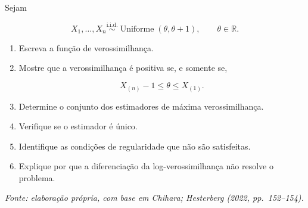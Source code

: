 \documentclass[
  letterpaper,
  DIV=11,
  numbers=noendperiod]{scrreprt}
\begin{document}
\begin{tcolorbox}[enhanced jigsaw, colback=white, leftrule=.75mm, colbacktitle=quarto-callout-tip-color!10!white, breakable, titlerule=0mm, bottomtitle=1mm, title=\textcolor{quarto-callout-tip-color}{\faLightbulb}\hspace{0.5em}{Exercício 6 --- Suporte dependente do parâmetro}, colframe=quarto-callout-tip-color-frame, toprule=.15mm, opacityback=0, bottomrule=.15mm, opacitybacktitle=0.6, arc=.35mm, toptitle=1mm, rightrule=.15mm, coltitle=black, left=2mm]

Sejam

\[X_1,\ldots,X_n
\overset{\mathrm{i.i.d.}}{\sim}
\operatorname{Uniforme}(\theta,\theta+1),
\qquad \theta\in\mathbb{R}.\]

\begin{enumerate}
\def\labelenumi{\arabic{enumi}.}
\item
  Escreva a função de verossimilhança.
\item
  Mostre que a verossimilhança é positiva se, e somente se,

  \[X_{(n)}-1
  \leq
  \theta
  \leq
  X_{(1)}.\]
\item
  Determine o conjunto dos estimadores de máxima verossimilhança.
\item
  Verifique se o estimador é único.
\item
  Identifique as condições de regularidade que não são satisfeitas.
\item
  Explique por que a diferenciação da log-verossimilhança não resolve o
  problema.
\end{enumerate}

\emph{Fonte: elaboração própria, com base em Chihara; Hesterberg (2022,
pp.~152--154).}

\end{tcolorbox}
\end{document}
